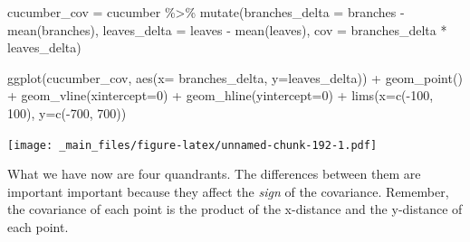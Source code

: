 \documentclass[
]{book}
\newenvironment{Shaded}{\begin{snugshade}}{\end{snugshade}}
\newcommand{\AttributeTok}[1]{\textcolor[rgb]{0.77,0.63,0.00}{#1}}
\newcommand{\DecValTok}[1]{\textcolor[rgb]{0.00,0.00,0.81}{#1}}
\newcommand{\FunctionTok}[1]{\textcolor[rgb]{0.00,0.00,0.00}{#1}}
\newcommand{\NormalTok}[1]{#1}
\newcommand{\OtherTok}[1]{\textcolor[rgb]{0.56,0.35,0.01}{#1}}
\newcommand{\SpecialCharTok}[1]{\textcolor[rgb]{0.00,0.00,0.00}{#1}}
\begin{document}
\begin{Shaded}
\begin{Highlighting}[]
\NormalTok{cucumber\_cov }\OtherTok{=}\NormalTok{ cucumber }\SpecialCharTok{\%\textgreater{}\%}
  \FunctionTok{mutate}\NormalTok{(}\AttributeTok{branches\_delta =}\NormalTok{ branches }\SpecialCharTok{{-}} \FunctionTok{mean}\NormalTok{(branches),}
         \AttributeTok{leaves\_delta =}\NormalTok{ leaves }\SpecialCharTok{{-}} \FunctionTok{mean}\NormalTok{(leaves),}
         \AttributeTok{cov =}\NormalTok{ branches\_delta }\SpecialCharTok{*}\NormalTok{ leaves\_delta)}

\FunctionTok{ggplot}\NormalTok{(cucumber\_cov, }\FunctionTok{aes}\NormalTok{(}\AttributeTok{x=}\NormalTok{ branches\_delta, }\AttributeTok{y=}\NormalTok{leaves\_delta)) }\SpecialCharTok{+}
  \FunctionTok{geom\_point}\NormalTok{() }\SpecialCharTok{+}
  \FunctionTok{geom\_vline}\NormalTok{(}\AttributeTok{xintercept=}\DecValTok{0}\NormalTok{) }\SpecialCharTok{+}
  \FunctionTok{geom\_hline}\NormalTok{(}\AttributeTok{yintercept=}\DecValTok{0}\NormalTok{) }\SpecialCharTok{+}
  \FunctionTok{lims}\NormalTok{(}\AttributeTok{x=}\FunctionTok{c}\NormalTok{(}\SpecialCharTok{{-}}\DecValTok{100}\NormalTok{, }\DecValTok{100}\NormalTok{), }\AttributeTok{y=}\FunctionTok{c}\NormalTok{(}\SpecialCharTok{{-}}\DecValTok{700}\NormalTok{, }\DecValTok{700}\NormalTok{))}
\end{Highlighting}
\end{Shaded}

\texttt{[image: \_main\_files/figure-latex/unnamed-chunk-192-1.pdf]}

What we have now are four quandrants. The differences between them are important important because they affect the \emph{sign} of the covariance. Remember, the covariance of each point is the product of the x-distance and the y-distance of each point.
\end{document}
